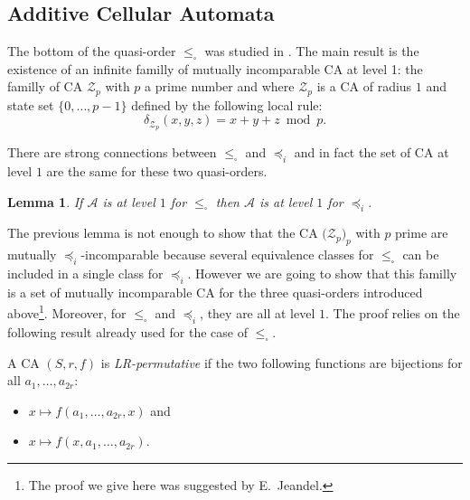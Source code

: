 \documentclass[a4paper]{elsarticle}
\def\qed{\relax\ifmmode\hskip2em \blacksquare\else\unskip\nobreak\hfill\hskip1em $\blacksquare$\fi}
\newcommand{\ACA}{\mathcal{A}}
\newcommand{\ACB}{\mathcal{B}}
\newcommand\sac{\sqsubseteq}
\newcommand\bulk[2]{{#1}^{\left\langle{#2}\right\rangle}}
\newcommand{\simu}{\preccurlyeq}
\newcommand{\sacsimu}{\simu_i}
\newcommand{\sacsimc}[1]{\left[{#1}\right]_i}
\newcommand\grporder{\leqslant_\square}
\newcommand\grp[2]{{#1}^{[#2]}}
\newcommand\grpclass[1]{\left[{#1}\right]_{\Box}}
\newcommand\sing{\bot}
\newcommand\zee[1]{\mathcal{Z}_{#1}}
\newtheorem{lm}{Lemma}[section]
\begin{document}
\subsection{Additive Cellular Automata}
\label{sec:botadd}

The bottom of the quasi-order $\grporder$ was studied in
\cite{Mazoyer:1999:IOC}. The main result is the existence of an infinite familly
of mutually incomparable CA at level 1: the familly of CA $\zee{p}$
with $p$ a prime number and where $\zee{p}$ is a CA of radius $1$ and
state set ${\{0,\ldots,p-1\}}$ defined by the following local rule:
\[\delta_{\zee{p}}(x,y,z) = x+y+z \bmod p.\]

There are strong connections between $\grporder$ and $\sacsimu$ and in
fact the set of CA at level $1$ are the same for these two
quasi-orders.

\begin{lm}
  \label{lm:levelone}
  If $\ACA$ is at level $1$ for $\grporder$ then $\ACA$ is at level
  $1$ for $\sacsimu$.
\end{lm}

The previous lemma is not enough to show that the CA
${\bigl(\zee{p}\bigr)_p}$ with $p$ prime are mutually
$\sacsimu$-incomparable because several equivalence classes for
$\grporder$ can be included in a single class for $\sacsimu$.  However
we are going to show that this familly is a set of mutually
incomparable CA for the three quasi-orders introduced
above\footnote{The proof we give here was suggested by
  E.~Jeandel.}. Moreover, for $\grporder$ and $\sacsimu$, they are all
at level $1$. The proof relies on the following result already used
for the case of $\grporder$.

A CA ${(S,r,f)}$ is \emph{LR-permutative} if the two following
functions are bijections for all ${a_1,\ldots,a_{2r}}$:
\begin{itemize}
\item ${x\mapsto f(a_1,\ldots,a_{2r},x)}$ and
\item ${x\mapsto f(x,a_1,\ldots,a_{2r})}$.
\end{itemize}
\end{document}
